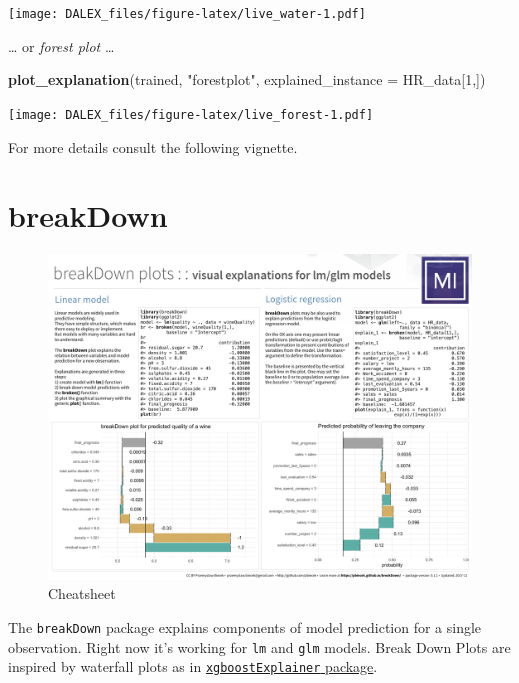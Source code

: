\documentclass[]{book}
\newenvironment{Shaded}{\begin{snugshade}}{\end{snugshade}}
\newcommand{\KeywordTok}[1]{\textcolor[rgb]{0.13,0.29,0.53}{\textbf{#1}}}
\newcommand{\DataTypeTok}[1]{\textcolor[rgb]{0.13,0.29,0.53}{#1}}
\newcommand{\DecValTok}[1]{\textcolor[rgb]{0.00,0.00,0.81}{#1}}
\newcommand{\StringTok}[1]{\textcolor[rgb]{0.31,0.60,0.02}{#1}}
\newcommand{\NormalTok}[1]{#1}
\theoremstyle{definition}
\theoremstyle{definition}
\theoremstyle{definition}
\theoremstyle{remark}
\begin{document}
\texttt{[image: DALEX\_files/figure-latex/live\_water-1.pdf]}

\ldots{} or \emph{forest plot} \ldots{}

\begin{Shaded}
\begin{Highlighting}[]
\KeywordTok{plot_explanation}\NormalTok{(trained, }\StringTok{"forestplot"}\NormalTok{, }\DataTypeTok{explained_instance =}\NormalTok{ HR_data[}\DecValTok{1}\NormalTok{,])}
\end{Highlighting}
\end{Shaded}

\texttt{[image: DALEX\_files/figure-latex/live\_forest-1.pdf]}

For more details consult the following vignette.

\section{breakDown}\label{breakdown}

\begin{figure}
\centering
\includegraphics{images/DALEX_breakDown.png}
\caption{Cheatsheet}
\end{figure}

The \texttt{breakDown} package \citep{breakDown} explains components of
model prediction for a single observation. Right now it's working for
\texttt{lm} and \texttt{glm} models. Break Down Plots are inspired by
waterfall plots as in
\href{https://github.com/AppliedDataSciencePartners/xgboostExplainer}{\texttt{xgboostExplainer}
package}.
\end{document}
